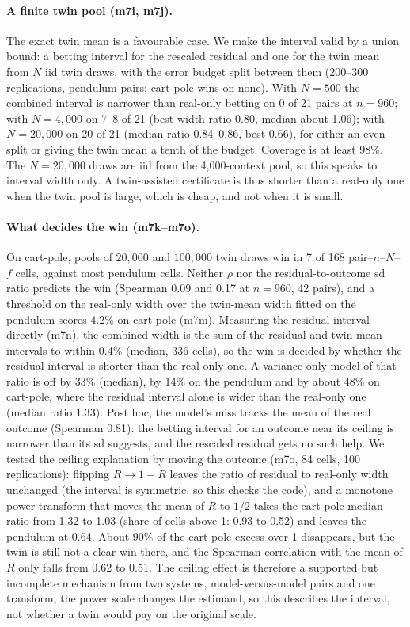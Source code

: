 \documentclass[11pt]{article}
\begin{document}
\paragraph{A finite twin pool (m7i, m7j).} The exact twin mean is a favourable case. We make the interval valid by a union bound: a betting interval for the rescaled residual and one for the twin mean from $N$ iid twin draws, with the error budget split between them (200--300 replications, pendulum pairs; cart-pole wins on none). With $N=500$ the combined interval is narrower than real-only betting on 0 of 21 pairs at $n=960$; with $N=4{,}000$ on 7--8 of 21 (best width ratio 0.80, median about 1.06); with $N=20{,}000$ on 20 of 21 (median ratio 0.84--0.86, best 0.66), for either an even split or giving the twin mean a tenth of the budget. Coverage is at least 98\%. The $N=20{,}000$ draws are iid from the 4{,}000-context pool, so this speaks to interval width only. A twin-assisted certificate is thus shorter than a real-only one when the twin pool is large, which is cheap, and not when it is small. \paragraph{What decides the win (m7k--m7o).} On cart-pole, pools of $20{,}000$ and $100{,}000$ twin draws win in 7 of 168 pair--$n$--$N$--$f$ cells, against most pendulum cells. Neither $\rho$ nor the residual-to-outcome sd ratio predicts the win (Spearman 0.09 and 0.17 at $n=960$, 42 pairs), and a threshold on the real-only width over the twin-mean width fitted on the pendulum scores 4.2\% on cart-pole (m7m). Measuring the residual interval directly (m7n), the combined width is the sum of the residual and twin-mean intervals to within 0.4\% (median, 336 cells), so the win is decided by whether the residual interval is shorter than the real-only one. A variance-only model of that ratio is off by 33\% (median), by 14\% on the pendulum and by about 48\% on cart-pole, where the residual interval alone is wider than the real-only one (median ratio 1.33). Post hoc, the model's miss tracks the mean of the real outcome (Spearman 0.81): the betting interval for an outcome near its ceiling is narrower than its sd suggests, and the rescaled residual gets no such help. We tested the ceiling explanation by moving the outcome (m7o, 84 cells, 100 replications): flipping $R\to1-R$ leaves the ratio of residual to real-only width unchanged (the interval is symmetric, so this checks the code), and a monotone power transform that moves the mean of $R$ to $1/2$ takes the cart-pole median ratio from 1.32 to 1.03 (share of cells above 1: 0.93 to 0.52) and leaves the pendulum at 0.64. About 90\% of the cart-pole excess over 1 disappears, but the twin is still not a clear win there, and the Spearman correlation with the mean of $R$ only falls from 0.62 to 0.51. The ceiling effect is therefore a supported but incomplete mechanism from two systems, model-versus-model pairs and one transform; the power scale changes the estimand, so this describes the interval, not whether a twin would pay on the original scale.
\end{document}
